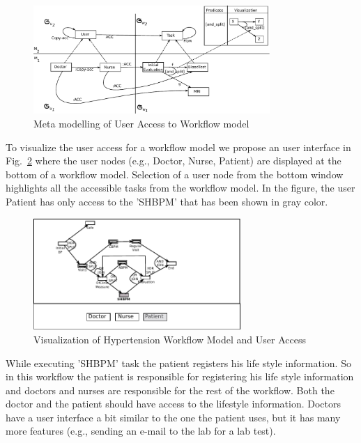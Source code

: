 \documentclass[a4paper]{llncs}
\begin{document}
\begin{figure}
  \begin{center}
    \includegraphics[width=0.8\textwidth]{access}
  \end{center} 
  \caption{Meta modelling of User Access to Workflow model}
  \label{fig:access}  
\end{figure}


To visualize the user access for a workflow model we propose an user interface in Fig.~\ref{fig:htn_uaccess} where the user nodes (e.g., Doctor, Nurse, Patient) 
are displayed at the bottom of a workflow model. Selection of a user node from the bottom window highlights all the accessible tasks from the workflow model. 
In the figure, the user Patient has only access to the 'SHBPM' that has been shown in gray color. 


\begin{figure}
  \begin{center}
    \includegraphics[width=0.7\textwidth]{hypertension_uaccess}
  \end{center} 
  \caption{Visualization of Hypertension Workflow Model and User Access}
  \label{fig:htn_uaccess}  
\end{figure}

While executing 'SHBPM' task the patient registers his life style information. So in this workflow the patient is responsible for registering his life style information 
and doctors and nurses are responsible for the rest of the workflow.
Both the doctor and the patient should have access to the lifestyle information.
Doctors have a user interface a bit similar to the one the patient uses, but it has many more features (e.g., sending an e-mail to the lab for a lab test).
\end{document}
